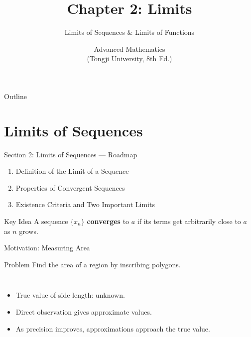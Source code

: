 \documentclass[aspectratio=169,10pt]{beamer}
\title{Chapter 2: Limits}
\subtitle{Limits of Sequences \& Limits of Functions}
\author{Advanced Mathematics \\ (Tongji University, 8th Ed.)}
\date{}
\institute{}
\begin{document}
\begin{frame}
  \titlepage
\end{frame}

\begin{frame}{Outline}
  \tableofcontents
\end{frame}

\section{Limits of Sequences}

\begin{frame}{Section 2: Limits of Sequences --- Roadmap}
  \begin{enumerate}
    \item Definition of the Limit of a Sequence
    \item Properties of Convergent Sequences
    \item Existence Criteria and Two Important Limits
  \end{enumerate}
  \vfill
  \begin{block}{Key Idea}
    A sequence $\{x_n\}$ \textbf{converges} to $a$ if its terms get
    arbitrarily close to $a$ as $n$ grows.
  \end{block}
\end{frame}

\begin{frame}{Motivation: Measuring Area}
  \begin{exampleblock}{Problem}
    Find the area of a region by inscribing polygons.
  \end{exampleblock}
  \pause
  \begin{columns}
    \begin{itemize}
      \item<2-> True value of side length: unknown.
      \item<3-> Direct observation gives approximate values.
      \item<4-> As precision improves, approximations approach the true value.
    \end{itemize}
    \begin{center}
    \end{center}
  \end{columns}
\end{frame}
\end{document}
